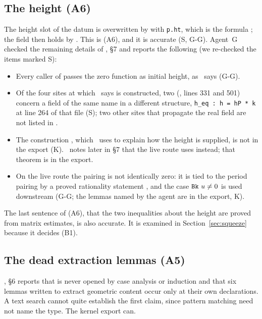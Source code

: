 \subsection{The height (A6)}
\label{sec:height-facts}


The height slot of the datum is overwritten by  with \texttt{p.ht}, which is the formula ; the field  then holds by . This is (A6), and it is accurate (\textsf{S}, \textsf{G-G}).
Agent~G checked the remaining details of \N, \S7 and reports the following (we re-checked the items marked \textsf{S}):
\begin{itemize}
\item Every caller of  passes the zero function as initial height, as \N\ says (\textsf{G-G}).
\item Of the four sites at which \N\ says  is constructed, two (, lines 331 and 501) concern a field of the same name in a different structure,
\texttt{h\_eq : h = hP * k} at line 264 of that file (\textsf{S}); two other sites that propagate the real field are not listed in \N.
\item The construction , which \N\ uses to explain how the height is supplied, is not in the export (\textsf{K}). \N\ notes later in \S7 that the live route uses  instead; that theorem is in the export.
\item On the live route the pairing  is not identically zero: it is tied to the period pairing  by a proved rationality statement , and the case $\text{\texttt{Bk}}\ u \neq 0$ is used downstream (\textsf{G-G}; the lemmas named by the agent are in the export, \textsf{K}).
\end{itemize}
The last sentence of (A6), that the two inequalities about the height are proved from matrix estimates, is also accurate. It is examined in Section~\ref{sec:squeeze} because it decides (B1).

\subsection{The dead extraction lemmas (A5)}
\label{sec:dead}

\N, \S6 reports that  is never opened by case analysis or induction and that six lemmas written to extract geometric content occur only at their own declarations.
A text search cannot quite establish the first claim, since pattern matching need not name the type. The kernel export can.


